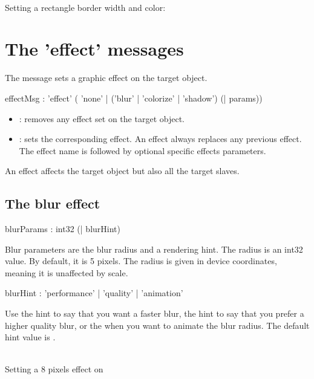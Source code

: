 \documentclass[a4paper,twoside]{report}
\newcommand{\sublevel}[1]	{\section{#1}}
\newcommand{\subsublevel}[1]	{\subsection{#1}}
\begin{document}
\example \\
Setting a rectangle border width and color:

\sublevel{The 'effect' messages}
\label{effectmsg}

The  message sets a graphic effect on the target object.


\begin{rail}
effectMsg : 'effect' ( 'none'
		| ('blur'
		| 'colorize'
		| 'shadow') (| params)) 		
\end{rail}

\begin{itemize}
\item {}: removes any effect set on the target object.
\item {}: sets the corresponding effect. An effect always replaces any previous effect. The effect name is followed by optional specific effects parameters.
\end{itemize}

\note{} An effect affects the target object but also all the target slaves.

\subsublevel{The blur effect}
\label{eblur}

\begin{rail}
blurParams : int32 (| blurHint)
\end{rail}

Blur parameters are the blur radius and a rendering hint. The radius is an int32 value. By default, it is 5 pixels. The radius is given in device coordinates, meaning it is unaffected by scale. 

\begin{rail}
blurHint : 'performance' | 'quality' | 'animation'
\end{rail}
Use the  hint to say that you want a faster blur, the  hint to say that you prefer a higher quality blur, or the  when you want to animate the blur radius. The default hint value is .

\example \\
Setting a 8 pixels effect on 
\end{document}
